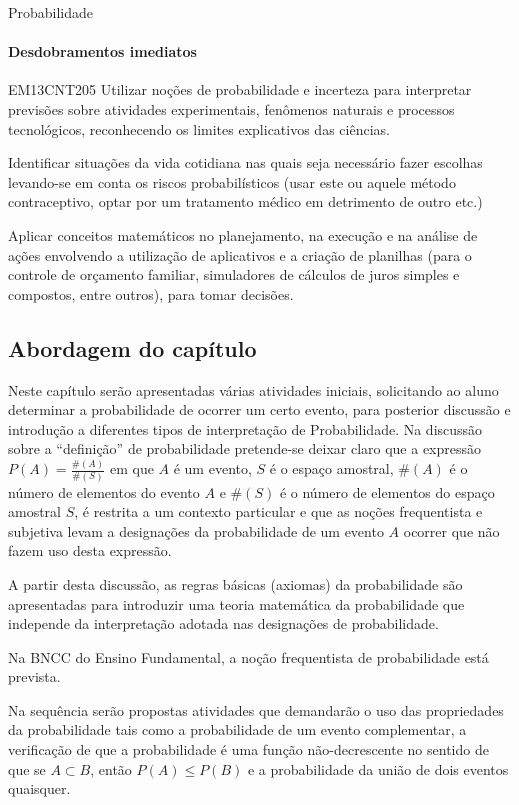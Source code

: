 \begin{apresentacao}{Probabilidade}
\paragraph{Desdobramentos imediatos}

\begin{habilities}{EM13CNT205}
Utilizar noções de probabilidade e incerteza para interpretar previsões sobre atividades experimentais, fenômenos naturais e processos tecnológicos, reconhecendo os limites explicativos das ciências.

Identificar situações da vida cotidiana nas quais seja necessário fazer escolhas levando-se em conta os riscos probabilísticos (usar este ou aquele método contraceptivo, optar por um tratamento médico em detrimento de outro etc.)

Aplicar conceitos matemáticos no planejamento, na execução e na análise de ações envolvendo a utilização de aplicativos e a criação de planilhas (para o controle de orçamento familiar, simuladores de cálculos de juros simples e compostos, entre outros), para tomar decisões.
\end{habilities}

\subsection{Abordagem do capítulo}
Neste capítulo serão apresentadas várias atividades iniciais, solicitando ao aluno determinar a probabilidade de ocorrer um certo evento, para posterior discussão e introdução a diferentes tipos de interpretação de Probabilidade. Na discussão sobre a “definição”{} de probabilidade pretende-se deixar claro que a expressão $P(A)=\frac{\#(A)}{\#(S)}$ em que $A$ é um evento, $S$ é o espaço amostral, $\#(A)$ é o número de elementos do evento $A$ e $\#(S)$ é o número de elementos do espaço amostral $S$, é restrita a um contexto particular e que as noções frequentista e subjetiva levam a designações da probabilidade de um evento $A$ ocorrer que não fazem uso desta expressão.

A partir desta discussão, as regras básicas (axiomas) da probabilidade são apresentadas para introduzir uma teoria matemática da probabilidade que independe da interpretação adotada nas designações de probabilidade.

Na BNCC do Ensino Fundamental, a noção frequentista de probabilidade está prevista.

Na sequência serão propostas atividades que demandarão o uso das propriedades da probabilidade tais como a probabilidade de um evento complementar, a verificação de que a probabilidade é uma função não-decrescente no sentido de que se $A\subset B$, então $P(A)\leq P(B)$ e a probabilidade da união de dois eventos quaisquer.


\end{apresentacao}
